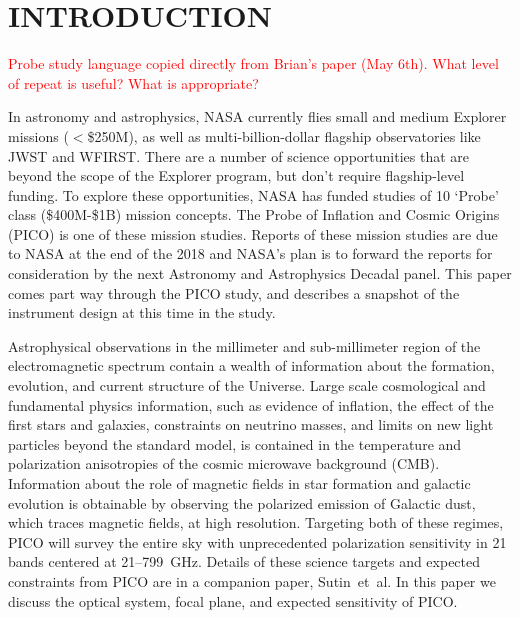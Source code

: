 \documentclass[]{spie}  %
\newcommand{\comr}[1]{\textcolor{red}{#1}}
\begin{document}
\section{INTRODUCTION}
\label{sec:intro}  

\comr{Probe study language copied directly from Brian's paper (May 6th).  What level of repeat is useful?  What is appropriate?}

In astronomy and astrophysics, NASA currently flies small and medium Explorer missions ($<$\$250M), as well as multi-billion-dollar flagship observatories like JWST and WFIRST. There are a number of science opportunities that are beyond the scope of the Explorer program, but don't require flagship-level funding. To explore these opportunities, NASA has funded studies of 10 `Probe' class (\$400M-\$1B) mission concepts. The Probe of Inflation and Cosmic Origins (PICO) is one of these mission studies. Reports of these mission studies are due to NASA at the end of the 2018 and NASA's plan is to forward the reports for consideration by the next Astronomy and Astrophysics Decadal panel. This paper comes part way through the PICO study, and describes a snapshot of the  instrument design at this time in the study.

Astrophysical observations in the  millimeter and sub-millimeter region of the electromagnetic spectrum contain a wealth of information about 
the formation, evolution, and current structure of the Universe.  Large scale cosmological and fundamental physics information, such as 
evidence of inflation, the effect of the first stars and galaxies, constraints on neutrino masses, and limits on new light particles beyond 
the standard model, is contained in the temperature and polarization anisotropies of the cosmic microwave background (CMB).  Information 
about the role of magnetic fields in star formation and galactic evolution is obtainable by observing the polarized emission of Galactic dust, which 
traces magnetic fields, at high resolution. Targeting both of these regimes, PICO will survey the entire sky with unprecedented polarization sensitivity 
in 21 bands centered at 21--799~GHz.  Details of these science targets and expected constraints from PICO are in a companion paper, Sutin~et~al.\cite{brian_spie} 
In this paper we discuss the optical system, focal plane, and expected sensitivity of PICO.

\end{document}
